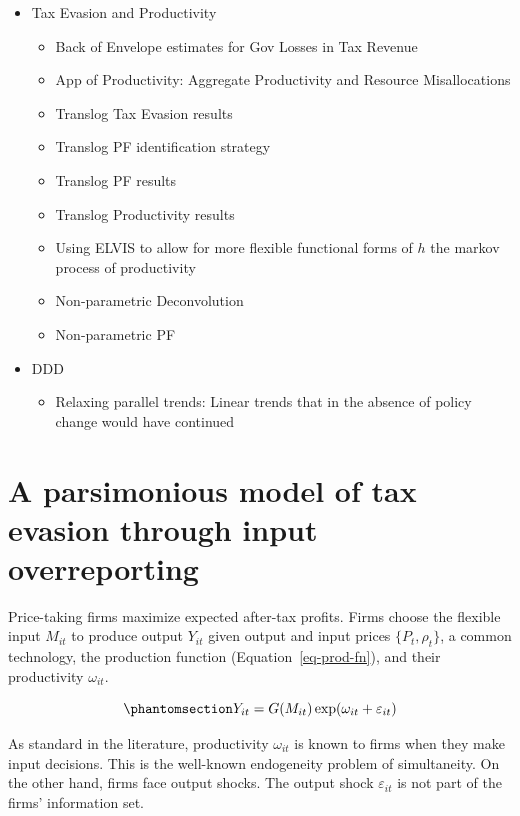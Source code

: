 \documentclass[
  12pt]{article}
\providecommand{\tightlist}{%
  \setlength{\itemsep}{0pt}\setlength{\parskip}{0pt}}\usepackage{longtable,booktabs,array}
\theoremstyle{definition}
\theoremstyle{remark}
\begin{document}
\begin{itemize}
\tightlist
\item
  Tax Evasion and Productivity

  \begin{itemize}
  \tightlist
  \item
    Back of Envelope estimates for Gov Losses in Tax Revenue
  \item
    App of Productivity: Aggregate Productivity and Resource
    Misallocations
  \item
    Translog Tax Evasion results
  \item
    Translog PF identification strategy
  \item
    Translog PF results
  \item
    Translog Productivity results
  \item
    Using ELVIS to allow for more flexible functional forms of \(h\) the
    markov process of productivity
  \item
    Non-parametric Deconvolution
  \item
    Non-parametric PF
  \end{itemize}
\item
  DDD

  \begin{itemize}
  \tightlist
  \item
    Relaxing parallel trends: Linear trends that in the absence of
    policy change would have continued
  \end{itemize}
\end{itemize}

\section{A parsimonious model of tax evasion through input
overreporting}\label{a-parsimonious-model-of-tax-evasion-through-input-overreporting}

Price-taking firms maximize expected after-tax profits. Firms choose the
flexible input \(M_{it}\) to produce output \(Y_{it}\) given output and
input prices \(\{P_{t}, \rho_t\}\), a common technology, the production
function (Equation~\ref{eq-prod-fn}), and their productivity
\(\omega_{it}\).

\begin{equation}\phantomsection\label{eq-prod-fn}{
Y_{it}=G(M_{it})\exp(\omega_{it}+\varepsilon_{it})
}\end{equation}

As standard in the literature, productivity \(\omega_{it}\) is known to
firms when they make input decisions. This is the well-known endogeneity
problem of simultaneity. On the other hand, firms face output shocks.
The output shock \(\varepsilon_{it}\) is not part of the firms'
information set.
\end{document}
